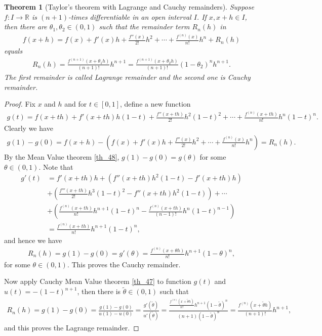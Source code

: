 \documentclass[10pt]{book}
\newtheorem{theorem}{Theorem}[chapter]
\theoremstyle{definition}
\numberwithin{equation}{chapter}
\begin{document}
\begin{theorem}[Taylor's theorem with Lagrange and Cauchy remainders]\label{th_628}
Suppose $f: I \to \mathbb{R}$ is $(n+1)$-times differentiable in an open interval $I$. If $x, x + h \in I$, then there are $\theta_1, \theta_2 \in (0,1)$ such that the remainder term $R_n(h)$ in
\begin{align*}
    f(x + h) = f(x) + f'(x)h + \frac{f''(x)}{2!}h^2 + \cdots + \frac{f^{(n)}(x)}{n!}h^n + R_n(h)
\end{align*}
equals
\begin{align*}
    R_n(h) = \frac{f^{(n+1)}(x+\theta_1 h)}{(n+1)!} h^{n+1} = \frac{f^{(n+1)}(x+\theta_2 h)}{(n+1)!} (1-\theta_2)^n h^{n+1}.
\end{align*}
The first remainder is called Lagrange remainder and the second one is Cauchy remainder.
\end{theorem}
\begin{proof}
Fix $x$ and $h$ and for $t \in [0,1]$, define a new function
\begin{align*}
    g(t) = f(x+th) + f'(x+th)h(1-t) + \frac{f''(x+th)}{2!} h^2 (1-t)^2 + \cdots + \frac{f^{(n)}(x+th)}{n!} h^n (1-t)^n.
\end{align*}
Clearly we have 
\begin{align*}
    g(1) - g(0) = f(x+h) - \left(f(x) + f'(x)h + \frac{f''(x)}{2!}h^2 + \cdots + \frac{f^{(n)}(x)}{n!}h^n\right) = R_n(h).
\end{align*}
By the Mean Value theorem \ref{th_48}, $g(1) - g(0) = g(\theta)$ for some $\theta \in (0,1)$. Note that
\begin{align*}
    g'(t) & = f'(x+th)h + \left(f''(x+th)h^2(1-t) - f'(x+th)h\right) \\
    & + \left(\frac{f'''(x+th)}{2!} h^3 (1-t)^2 - f''(x+th)h^2(1-t)\right) + \cdots \\
    & + \left(\frac{f^{(n)}(x+th)}{n!} h^{n+1} (1-t)^n - \frac{f^{(n)}(x+th)}{(n-1)!} h^n (1-t)^{n-1}\right) \\
    & = \frac{f^{(n)}(x+th)}{n!} h^{n+1} (1-t)^n,
\end{align*}
and hence we have
\begin{align*}
    R_n(h) = g(1) - g(0) = g'(\theta) = \frac{f^{(n)}(x+\theta h)}{n!} h^{n+1} (1-\theta)^n,
\end{align*}
for some $\theta \in (0,1)$. This proves the Cauchy remainder.

Now apply Cauchy Mean Value theorem \ref{th_47} to function $g(t)$ and $u(t) = -(1 - t)^{n+1}$, then there is $\widetilde{\theta} \in (0,1)$ such that
\begin{align*}
    R_n(h) = g(1) - g(0) = \frac{g(1) - g(0)}{u(1) - u(0)} = \frac{g'(\widetilde{\theta})}{u'(\widetilde{\theta})} = \frac{\frac{f^{(n)}(x+\widetilde{\theta} h)}{n!} h^{n+1} (1-\widetilde{\theta})^n}{(n+1)(1 - \widetilde{\theta})^n} = \frac{f^{(n)}(x+\widetilde{\theta} h)}{(n+1)!} h^{n+1},
\end{align*}
and this proves the Lagrange remainder.
\end{proof}
\end{document}
